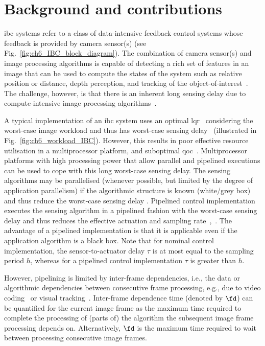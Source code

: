 \section{Background and contributions}
\Gls{ibc} systems refer to a class of data-intensive feedback control systems whose feedback is provided by camera sensor(s) (see Fig.~\ref{fig:ch6_IBC_block_diagram}). 
 The combination of camera sensor(s) and image processing algorithms is capable of detecting a rich set of features in an image that can be used to compute the states of the system such as relative position or distance, depth perception, and tracking of the object-of-interest~\cite{pendleton2017perception}. 
 The challenge, however, is that there is an inherent long sensing delay due to compute-intensive image processing algorithms~\cite{saidi2018future}.  

A typical implementation of an \gls{ibc} system uses an optimal \gls{lqr}~\cite{dorf2011modern} considering the worst-case image workload and thus has worst-case sensing delay~\cite{saidi2018future} (illustrated in Fig.~\ref{fig:ch6_workload_IBC}).
However, this results in poor effective resource utilisation in a multiprocessor platform, and suboptimal \gls{qoc}~\cite{fontantelli2013optimal}. 
Multiprocessor platforms with high processing power that allow parallel and pipelined executions can be used to cope with this long worst-case sensing delay. 
The sensing algorithms may be parallelised (whenever possible, but limited by the degree of application parallelism) if the algorithmic structure is known (white/grey box) and thus reduce the worst-case sensing delay \cite{saidi2018future}. 
Pipelined control implementation executes the sensing algorithm in a pipelined fashion 
with the worst-case sensing delay and thus reduces the effective actuation and sampling rate~\cite{medina2019designing},~\cite{krautgartner1998performance}.
The advantage of a pipelined implementation is that it is applicable even if the application algorithm is a black box.
Note that for nominal control implementation, the sensor-to-actuator delay $\tau$ is at most equal to the sampling period $h$, whereas for a pipelined control implementation $\tau$ is greater than $h$.

However, pipelining is limited by inter-frame dependencies, i.e., the data or algorithmic dependencies between consecutive frame processing, e.g., due to video coding~\cite{li2015lagrangian} or visual tracking~\cite{smeulders2013visual}. 
Inter-frame dependence time (denoted by $\fd$) can be quantified for the current image frame as the maximum time required to complete the processing of (parts of) the algorithm the subsequent image frame processing depends on. 
Alternatively, $\fd$ is the maximum time required to wait between processing consecutive image frames. 

